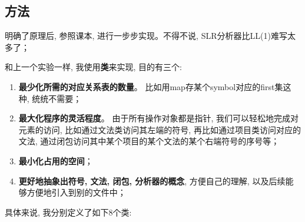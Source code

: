 \documentclass{zpt}
\begin{document}
    \subsection{方法}
    明确了原理后, 参照课本, 进行一步步实现。不得不说, SLR分析器比LL(1)难写太多了；\par
    和上一个实验一样, 我使用\textbf{类}来实现, 目的有三个:\begin{enumerate}
        \item \textbf{最少化所需的对应关系表的数量}。 比如用map存某个symbol对应的first集这种, 统统不需要；
        \item \textbf{最大化程序的灵活程度}。 由于所有操作对象都是指针, 我们可以轻松地完成对元素的访问, 比如通过文法类访问其左端的符号, 再比如通过项目类访问对应的文法, 通过闭包访问其中某个项目的某个文法的某个右端符号的序号等；
        \item \textbf{最小化占用的空间}；
        \item \textbf{更好地抽象出符号, 文法, 闭包, 分析器的概念}, 方便自己的理解, 以及后续能够方便地引入到别的文件中；
    \end{enumerate}
    具体来说, 我分别定义了如下8个类:
\end{document}
